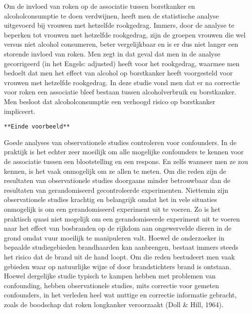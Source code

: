 \documentclass[12pt,dutch,coursenotes]{book}
\theoremstyle{definition}
\theoremstyle{definition}
\theoremstyle{definition}
\theoremstyle{remark}
\let\BeginKnitrBlock\begin \let\EndKnitrBlock\end
\begin{document}
Om de invloed van roken op de associatie tussen borstkanker en
alcoholconsumptie te doen verdwijnen, heeft men de statistische analyse
uitgevoerd bij vrouwen met hetzelfde rookgedrag. Immers, door de analyse
te beperken tot vrouwen met hetzelfde rookgedrag, zijn de groepen
vrouwen die wel versus niet alcohol consumeren, beter vergelijkbaar en
is er dus niet langer een storende invloed van roken. Men zegt in dat
geval dat men in de analyse gecorrigeerd (in het Engels: adjusted) heeft
voor het rookgedrag, waarmee men bedoelt dat men het effect van alcohol
op borstkanker heeft voorgesteld voor vrouwen met hetzelfde rookgedrag.
In deze studie vond men dat er na correctie voor roken een associatie
bleef bestaan tussen alcoholverbruik en borstkanker. Men besloot dat
alcoholconsumptie een verhoogd risico op borstkanker impliceert.

\texttt{**Einde\ voorbeeld**}

Goede analyses van observationele studies controleren voor confounders.
In de praktijk is het echter zeer moeilijk om alle mogelijke confounders
te kennen voor de associatie tussen een blootstelling en een respons. En
zelfs wanneer men ze zou kennen, is het vaak onmogelijk om ze allen te
meten. Om die reden zijn de resultaten van observationele studies
doorgaans minder betrouwbaar dan de resultaten van gerandomiseerd
gecontroleerde experimenten. Niettemin zijn observationele studies
krachtig en belangrijk omdat het in vele situaties onmogelijk is om een
gerandomiseerd experiment uit te voeren. Zo is het praktisch quasi niet
mogelijk om een gerandomiseerde experiment uit te voeren naar het effect
van bosbranden op de rijkdom aan ongewervelde dieren in de grond omdat
vuur moeilijk te manipuleren valt. Hoewel de onderzoeker in bepaalde
studiegebieden brandhaarden kan aanbrengen, bestaat immers steeds het
risico dat de brand uit de hand loopt. Om die reden bestudeert men vaak
gebieden waar op natuurlijke wijze of door brandstichters brand is
ontstaan. Hoewel dergelijke studie typisch te kampen hebben met
problemen van confounding, hebben observationele studies, mits correctie
voor gemeten confounders, in het verleden heel wat nuttige en correctie
informatie gebracht, zoals de boodschap dat roken longkanker veroorzaakt
(Doll \& Hill, 1964).

\BeginKnitrBlock{example}[Observationele versus gerandomiseerde studies]
\protect\hypertarget{exm:unnamed-chunk-30}{}{\label{exm:unnamed-chunk-30}
\iffalse (Observationele versus gerandomiseerde studies) \fi{} }
\EndKnitrBlock{example}
\end{document}
